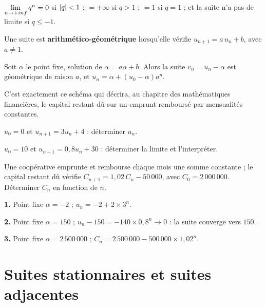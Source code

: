 \begin{propriete}
$\limn q^{n} = 0$ si $\left|q\right|<1$ ; $=+\infty$ si $q>1$ ; $=1$ si $q = 1$ ; et
la suite n'a pas de limite si $q \leq -1$.
\end{propriete}

\begin{definition}
Une suite est \textbf{arithmético-géométrique} lorsqu'elle vérifie
$u_{n+1} = a\,u_{n}+b$, avec $a \neq 1$.
\end{definition}

\begin{propriete}[réduction]
Soit $\alpha$ le point fixe, solution de $\alpha = a\alpha+b$. Alors la suite
$v_{n} = u_{n}-\alpha$ est géométrique de raison $a$, et
$u_{n} = \alpha + \left(u_{0}-\alpha\right)a^{n}$.
\end{propriete}

\begin{remarque}
C'est exactement ce schéma qui décrira, au chapitre des mathématiques
financières, le capital restant dû sur un emprunt remboursé par mensualités
constantes.
\end{remarque}

\begin{entrainement}
\exo[\niveau{1}] $u_{0} = 0$ et $u_{n+1} = 3u_{n}+4$ : déterminer $u_{n}$.

\exo[\niveau{2}] $u_{0} = 10$ et $u_{n+1} = 0{,}8u_{n}+30$ : déterminer la
limite et l'interpréter.

\exo[\niveau{3}] Une coopérative emprunte et rembourse chaque mois une somme
constante ; le capital restant dû vérifie $C_{n+1} = 1{,}02\,C_{n}-50\,000$,
avec $C_{0} = 2\,000\,000$. Déterminer $C_{n}$ en fonction de $n$.
\end{entrainement}

\begin{corrige}
\textbf{1.} Point fixe $\alpha = -2$ ; $u_{n} = -2+2\times3^{n}$.

\textbf{2.} Point fixe $\alpha = 150$ ; $u_{n}-150 = -140\times0{,}8^{n} \to 0$ :
la suite converge vers $150$.

\textbf{3.} Point fixe $\alpha = 2\,500\,000$ ;
$C_{n} = 2\,500\,000-500\,000\times1{,}02^{n}$.
\end{corrige}

\section{Suites stationnaires et suites adjacentes}

